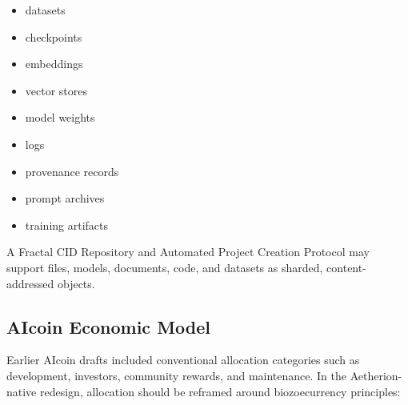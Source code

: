 ﻿\documentclass[12pt]{article}
\begin{document}
\begin{itemize}
  \item datasets
\end{itemize}
\begin{itemize}
  \item checkpoints
\end{itemize}
\begin{itemize}
  \item embeddings
\end{itemize}
\begin{itemize}
  \item vector stores
\end{itemize}
\begin{itemize}
  \item model weights
\end{itemize}
\begin{itemize}
  \item logs
\end{itemize}
\begin{itemize}
  \item provenance records
\end{itemize}
\begin{itemize}
  \item prompt archives
\end{itemize}
\begin{itemize}
  \item training artifacts
\end{itemize}

A Fractal CID Repository and Automated Project Creation Protocol may support files, models, documents, code, and datasets as sharded, content-addressed objects.

\subsection{AIcoin Economic Model}


Earlier AIcoin drafts included conventional allocation categories such as development, investors, community rewards, and maintenance. In the Aetherion-native redesign, allocation should be reframed around biozoecurrency principles:
\end{document}
